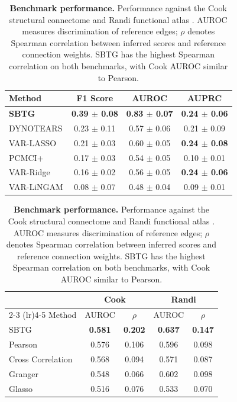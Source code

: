 \documentclass{article}
\theoremstyle{plain}
\theoremstyle{definition}
\theoremstyle{remark}
\newcommand{\1}{\mathbf{1}}
\begin{document}
\begin{table}[t]
\caption{\textbf{Synthetic benchmark (Nonlinear Tanh).} SBTG outperforms linear and nonlinear baselines in both binary detection (AUROC, AUPRC) and edge recovery (F1).}
\label{tab:synthetic}

\caption{\textbf{Benchmark performance.} Performance against the Cook structural connectome \citep{Cook2019} and Randi functional atlas \citep{Randi2023}.
AUROC measures discrimination of reference edges; $\rho$ denotes Spearman correlation between inferred scores and reference connection weights. 
SBTG has the highest Spearman correlation on both benchmarks, with Cook AUROC similar to Pearson.}
\label{tab:lag1_baselines}

\centering
\begin{minipage}[t]{0.48\linewidth}
\centering
\begin{scriptsize}
\setlength{\tabcolsep}{3pt}
\begin{tabular}{lccc}
\toprule
Method & F1 Score & AUROC & AUPRC \\
\midrule
\textbf{SBTG} & \textbf{0.39 $\pm$ 0.08} & \textbf{0.83 $\pm$ 0.07} & \textbf{0.24 $\pm$ 0.06} \\
DYNOTEARS & 0.23 $\pm$ 0.11 & 0.57 $\pm$ 0.06 & 0.21 $\pm$ 0.09 \\
VAR-LASSO & 0.21 $\pm$ 0.03 & 0.60 $\pm$ 0.05 & \textbf{0.24 $\pm$ 0.08} \\
PCMCI+ & 0.17 $\pm$ 0.03 & 0.54 $\pm$ 0.05 & 0.10 $\pm$ 0.01 \\
VAR-Ridge & 0.16 $\pm$ 0.02 & 0.56 $\pm$ 0.05 & \textbf{0.24 $\pm$ 0.06} \\
VAR-LiNGAM & 0.08 $\pm$ 0.07 & 0.48 $\pm$ 0.04 & 0.09 $\pm$ 0.01 \\
\bottomrule
\end{tabular}
\end{scriptsize}

\end{minipage}\hfill
\begin{minipage}[t]{0.48\linewidth}
\centering
\begin{scriptsize}
\setlength{\tabcolsep}{3pt}
\begin{tabular}{l cccc}
\toprule
& \multicolumn{2}{c}{\textbf{Cook}} & \multicolumn{2}{c}{\textbf{Randi}} \\
\cmidrule(lr){2-3} \cmidrule(lr){4-5}
Method & AUROC & $\rho$ & AUROC & $\rho$ \\
\midrule
SBTG              & \textbf{0.581} & \textbf{0.202} & \textbf{0.637} & \textbf{0.147} \\
Pearson           & 0.576          & 0.106          & 0.596          & 0.098          \\
Cross Correlation & 0.568          & 0.094          & 0.571          & 0.087          \\
Granger           & 0.548          & 0.066          & 0.602          & 0.098          \\
Glasso            & 0.516          & 0.076          & 0.533          & 0.070          \\
\bottomrule
\end{tabular}
\end{scriptsize}


\end{minipage}
\end{table}
\end{document}
